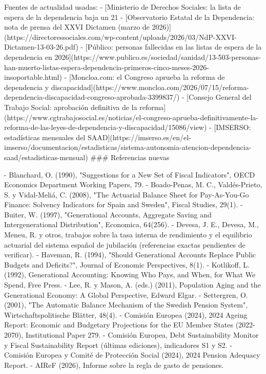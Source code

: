 \documentclass[10pt,a4paper]{article}
\begin{document}
Fuentes de actualidad usadas:
- [Ministerio de Derechos Sociales: la lista de espera de la dependencia baja un 21%
- [Observatorio Estatal de la Dependencia: nota de prensa del XXVI Dictamen (marzo de 2026)](https://directoressociales.com/wp-content/uploads/2026/03/NdP-XXVI-Dictamen-13-03-26.pdf)
- [Público: personas fallecidas en las listas de espera de la dependencia en 2026](https://www.publico.es/sociedad/sanidad/13-503-personas-han-muerto-listas-espera-dependencia-primeros-cinco-meses-2026-insoportable.html)
- [Moncloa.com: el Congreso aprueba la reforma de dependencia y discapacidad](https://www.moncloa.com/2026/07/15/reforma-dependencia-discapacidad-congreso-aprobada-3399837/)
- [Consejo General del Trabajo Social: aprobación definitiva de la reforma](https://www.cgtrabajosocial.es/noticias/el-congreso-aprueba-definitivamente-la-reforma-de-las-leyes-de-dependencia-y-discapacidad/15086/view)
- [IMSERSO: estadísticas mensuales del SAAD](https://imserso.es/en/el-imserso/documentacion/estadisticas/sistema-autonomia-atencion-dependencia-saad/estadisticas-mensual)
### Referencias nuevas

- Blanchard, O. (1990), "Suggestions for a New Set of Fiscal Indicators", OECD Economics Department Working Papers, 79.
- Boado-Penas, M. C., Valdés-Prieto, S. y Vidal-Meliá, C. (2008), "The Actuarial Balance Sheet for Pay-As-You-Go Finance: Solvency Indicators for Spain and Sweden", Fiscal Studies, 29(1).
- Buiter, W. (1997), "Generational Accounts, Aggregate Saving and Intergenerational Distribution", Economica, 64(256).
- Devesa, J. E., Devesa, M., Meneu, R. y otros, trabajos sobre la tasa interna de rendimiento y el equilibrio actuarial del sistema español de jubilación (referencias exactas pendientes de verificar).
- Haveman, R. (1994), "Should Generational Accounts Replace Public Budgets and Deficits?", Journal of Economic Perspectives, 8(1).
- Kotlikoff, L. (1992), Generational Accounting: Knowing Who Pays, and When, for What We Spend, Free Press.
- Lee, R. y Mason, A. (eds.) (2011), Population Aging and the Generational Economy: A Global Perspective, Edward Elgar.
- Settergren, O. (2001), "The Automatic Balance Mechanism of the Swedish Pension System", Wirtschaftspolitische Blätter, 48(4).
- Comisión Europea (2024), 2024 Ageing Report: Economic and Budgetary Projections for the EU Member States (2022-2070), Institutional Paper 279.
- Comisión Europea, Debt Sustainability Monitor y Fiscal Sustainability Report (últimas ediciones), indicadores S1 y S2.
- Comisión Europea y Comité de Protección Social (2024), 2024 Pension Adequacy Report.
- AIReF (2026), Informe sobre la regla de gasto de pensiones.
\end{document}
